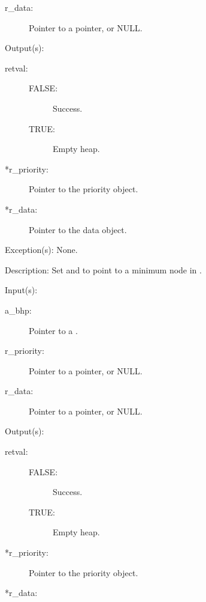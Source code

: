 \begin{capi}
\begin{capilist}
\begin{description}
		\item[r\_data: ]
			Pointer to a pointer, or NULL.
		\end{description}
	\item[Output(s): ]
		\begin{description}\item[]
		\item[retval: ]
			\begin{description}\item[]
			\item[FALSE: ] Success.
			\item[TRUE: ] Empty heap.
			\end{description}
		\item[*r\_priority: ]
			Pointer to the priority object.
		\item[*r\_data: ]
			Pointer to the data object.
		\end{description}
	\item[Exception(s): ] None.
	\item[Description: ]
		Set  and  to point to a
		minimum node in .
	\end{capilist}
\label{bhp_min_del}
	\begin{capilist}
	\item[Input(s): ]
		\begin{description}\item[]
		\item[a\_bhp: ]
			Pointer to a .
		\item[r\_priority: ]
			Pointer to a pointer, or NULL.
		\item[r\_data: ]
			Pointer to a pointer, or NULL.
		\end{description}
	\item[Output(s): ]
		\begin{description}\item[]
		\item[retval: ]
			\begin{description}\item[]
			\item[FALSE: ] Success.
			\item[TRUE: ] Empty heap.
			\end{description}
		\item[*r\_priority: ]
			Pointer to the priority object.
		\item[*r\_data: ]

\end{description}
\end{capilist}
\end{capi}
